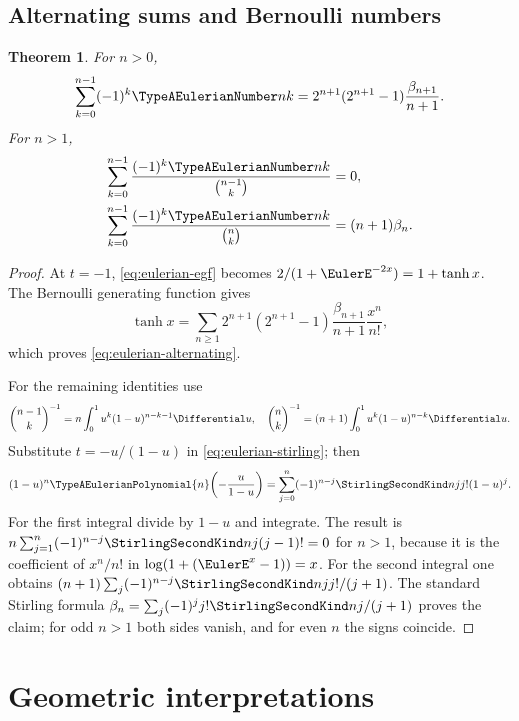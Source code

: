 \documentclass[11pt,a4paper,oneside,openany]{book}
\newtheorem{theorem}{Theorem}[chapter]
\theoremstyle{definition}
\theoremstyle{remark}
\begin{document}
\section{Alternating sums and Bernoulli numbers}
\begin{theorem}\label{thm:eulerian-alternating}
For $n>0$,
\begin{equation}\label{eq:eulerian-alternating}
 \sum_{k=0}^{n-1}(-1)^k\TypeAEulerianNumber nk
 =2^{n+1}(2^{n+1}-1)\frac{\beta_{n+1}}{n+1}.
\end{equation}
For $n>1$,
\begin{align}
 \sum_{k=0}^{n-1}\frac{(-1)^k\TypeAEulerianNumber nk}{\binom{n-1}{k}}&=0,
 \label{eq:eulerian-reciprocal-zero}\\
 \sum_{k=0}^{n-1}\frac{(-1)^k\TypeAEulerianNumber nk}{\binom nk}&=(n+1)\beta_n.
 \label{eq:eulerian-reciprocal-bernoulli}
\end{align}
\end{theorem}
\begin{proof}
At $t=-1$, \eqref{eq:eulerian-egf} becomes
$2/(1+\EulerE^{-2x})=1+\tanh x$.  The Bernoulli generating function gives
\[
 \tanh x=\sum_{n\ge1}
 2^{n+1}(2^{n+1}-1)\frac{\beta_{n+1}}{n+1}\frac{x^n}{n!},
\]
which proves \eqref{eq:eulerian-alternating}.

For the remaining identities use
\[
 \binom{n-1}{k}^{-1}=n\int_0^1u^k(1-u)^{n-k-1}\Differential u,
 \quad
 \binom nk^{-1}=(n+1)\int_0^1u^k(1-u)^{n-k}\Differential u.
\]
Substitute $t=-u/(1-u)$ in \eqref{eq:eulerian-stirling}; then
\begin{equation}\label{eq:eulerian-beta-transform}
 (1-u)^n\TypeAEulerianPolynomial{n}\!\left(-\frac{u}{1-u}\right)
 =\sum_{j=0}^{n}(-1)^{n-j}\StirlingSecondKind njj!(1-u)^j.
\end{equation}
For the first integral divide by $1-u$ and integrate.  The result is
$n\sum_{j=1}^n(-1)^{n-j}\StirlingSecondKind nj(j-1)!=0$ for $n>1$, because it is the
coefficient of $x^n/n!$ in
$\log(1+(\EulerE^x-1))=x$.  For the second integral one obtains
$(n+1)\sum_j(-1)^{n-j}\StirlingSecondKind njj!/(j+1)$.  The standard Stirling formula
$\beta_n=\sum_j(-1)^jj!\StirlingSecondKind nj/(j+1)$ proves the claim; for odd $n>1$ both
sides vanish, and for even $n$ the signs coincide.
\end{proof}

\chapter{Geometric interpretations}
\end{document}
